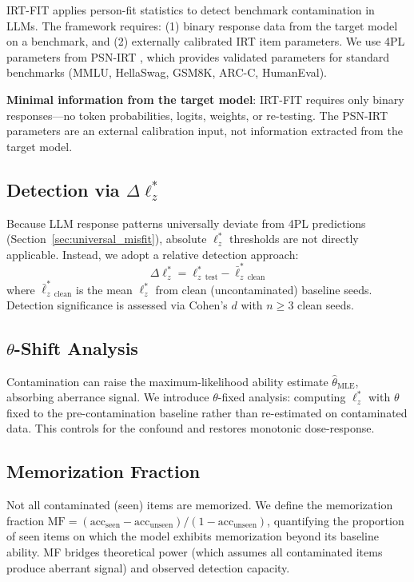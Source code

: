 \documentclass[11pt,a4paper]{article}
\begin{document}
IRT-FIT applies person-fit statistics to detect benchmark contamination in LLMs. The framework requires: (1) binary response data from the target model on a benchmark, and (2) externally calibrated IRT item parameters. We use 4PL parameters from PSN-IRT \cite{martinez2024using}, which provides validated parameters for standard benchmarks (MMLU, HellaSwag, GSM8K, ARC-C, HumanEval).

\textbf{Minimal information from the target model}: IRT-FIT requires only binary responses---no token probabilities, logits, weights, or re-testing. The PSN-IRT parameters are an external calibration input, not information extracted from the target model.

\subsection{Detection via $\Delta\ell_z^*$}

Because LLM response patterns universally deviate from 4PL predictions (Section~\ref{sec:universal_misfit}), absolute $\ell_z^*$ thresholds are not directly applicable. Instead, we adopt a relative detection approach:
\begin{equation}
\Delta\ell_z^* = \ell_z^*_{\text{test}} - \bar{\ell}_z^*_{\text{clean}}
\end{equation}
where $\bar{\ell}_z^*_{\text{clean}}$ is the mean $\ell_z^*$ from clean (uncontaminated) baseline seeds. Detection significance is assessed via Cohen's $d$ with $n \geq 3$ clean seeds.

\subsection{$\theta$-Shift Analysis}

Contamination can raise the maximum-likelihood ability estimate $\hat\theta_{\text{MLE}}$, absorbing aberrance signal. We introduce $\theta$-fixed analysis: computing $\ell_z^*$ with $\theta$ fixed to the pre-contamination baseline rather than re-estimated on contaminated data. This controls for the confound and restores monotonic dose-response.

\subsection{Memorization Fraction}

Not all contaminated (seen) items are memorized. We define the memorization fraction $\text{MF} = (\text{acc}_{\text{seen}} - \text{acc}_{\text{unseen}}) / (1 - \text{acc}_{\text{unseen}})$, quantifying the proportion of seen items on which the model exhibits memorization beyond its baseline ability. MF bridges theoretical power (which assumes all contaminated items produce aberrant signal) and observed detection capacity.
\end{document}
